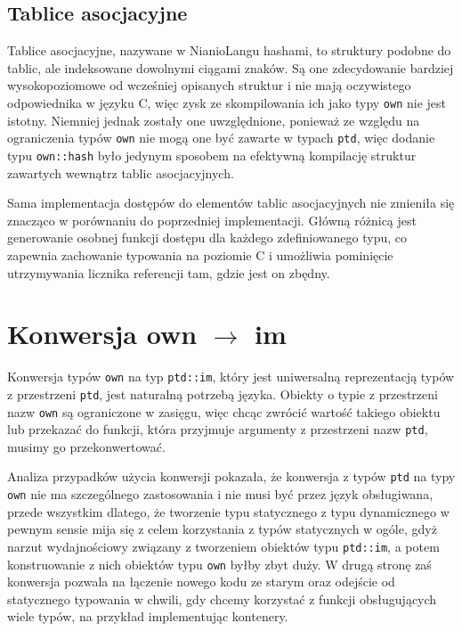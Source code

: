 \documentclass[licencjacka]{pracamgr}
\begin{document}
\subsection{Tablice asocjacyjne}
Tablice asocjacyjne, nazywane w NianioLangu hashami, to struktury podobne do tablic, ale indeksowane dowolnymi
ciągami znaków. Są one zdecydowanie bardziej wysokopoziomowe od wcześniej opisanych struktur i nie mają
oczywistego odpowiednika w języku C, więc zysk ze skompilowania ich jako typy \texttt{own} nie jest istotny.
Niemniej jednak zostały one uwzględnione, ponieważ ze względu na ograniczenia typów \texttt{own} nie mogą
one być zawarte w typach \texttt{ptd}, więc dodanie typu \texttt{own::hash} było jedynym sposobem na efektywną
kompilację struktur zawartych wewnątrz tablic asocjacyjnych.

Sama implementacja dostępów do elementów tablic asocjacyjnych nie zmieniła się znacząco w porównaniu
do poprzedniej implementacji. Główną różnicą jest generowanie osobnej funkcji dostępu dla każdego zdefiniowanego
typu, co zapewnia zachowanie typowania na poziomie C i umożliwia pominięcie utrzymywania licznika referencji
tam, gdzie jest on zbędny.

\section{Konwersja own $\rightarrow$ im}
\label{sec:own_to_im}
Konwersja typów \texttt{own} na typ \texttt{ptd::im}, który jest uniwersalną reprezentacją typów z przestrzeni \texttt{ptd},
jest naturalną potrzebą języka. Obiekty o typie z przestrzeni nazw \texttt{own} są ograniczone w zasięgu,
więc chcąc zwrócić wartość takiego obiektu lub przekazać do funkcji, która przyjmuje argumenty z przestrzeni
nazw \texttt{ptd}, musimy go przekonwertować.

Analiza przypadków użycia konwersji pokazała, że konwersja z typów \texttt{ptd} na typy \texttt{own} nie ma 
szczególnego zastosowania i nie musi być przez język obsługiwana, przede wszystkim dlatego,
że tworzenie typu statycznego z typu dynamicznego w pewnym sensie mija się z celem korzystania z typów statycznych w ogóle,
gdyż narzut wydajnościowy związany z tworzeniem obiektów typu \texttt{ptd::im}, a potem konstruowanie z nich obiektów typu \texttt{own} byłby zbyt duży.
W drugą stronę zaś konwersja pozwala na łączenie nowego kodu ze starym oraz odejście od statycznego typowania w chwili,
gdy chcemy korzystać z funkcji obsługujących wiele typów, na przykład implementując kontenery.
\end{document}
